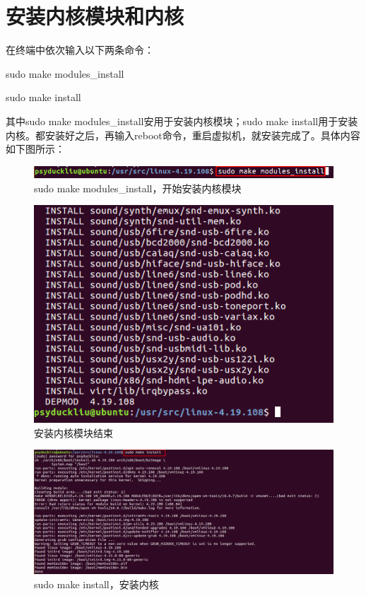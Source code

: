 \documentclass[11pt,a4paper]{article}
\begin{document}
	\section{安装内核模块和内核}
	在终端中依次输入以下两条命令：\par
	sudo make modules\_install\par       
	sudo make install\par
	其中sudo make modules\_install安用于安装内核模块；sudo make install用于安装内核。都安装好之后，再输入reboot命令，重启虚拟机，就安装完成了。具体内容如下图所示：
	\newpage
	\begin{figure}[h]
		\centering
		\includegraphics[width=0.7\linewidth]{Pictures/19_WPS}
		\caption{sudo make modules\_install，开始安装内核模块}
		\label{fig:19wps}
	\end{figure}
	\begin{figure}[h]
		\centering
		\includegraphics[width=0.7\linewidth]{Pictures/20}
		\caption{安装内核模块结束}
		\label{fig:20}
	\end{figure}
	\begin{figure}[h]
		\centering
		\includegraphics[width=0.5\linewidth]{Pictures/22_WPS}
		\caption{sudo make install，安装内核}
		\label{fig:22wps}
	\end{figure}
\end{document}
